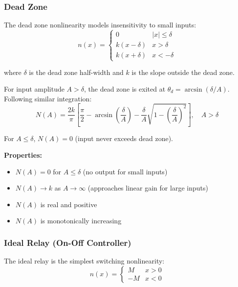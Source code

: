 \subsubsection{Dead Zone}

The dead zone nonlinearity models insensitivity to small inputs:
\begin{equation}
n(x) = \begin{cases}
0 & |x| \leq \delta \\
k(x - \delta) & x > \delta \\
k(x + \delta) & x < -\delta
\end{cases}
\label{eq:deadzone_def}
\end{equation}

where $\delta$ is the dead zone half-width and $k$ is the slope outside the dead zone.

For input amplitude $A > \delta$, the dead zone is exited at $\theta_d = \arcsin(\delta/A)$. Following similar integration:
\begin{equation}
\boxed{N(A) = \frac{2k}{\pi}\left[\frac{\pi}{2} - \arcsin\left(\frac{\delta}{A}\right) - \frac{\delta}{A}\sqrt{1 - \left(\frac{\delta}{A}\right)^2}\right], \quad A > \delta}
\label{eq:df_deadzone}
\end{equation}

For $A \leq \delta$, $N(A) = 0$ (input never exceeds dead zone).

\textbf{Properties:}
\begin{itemize}
    \item $N(A) = 0$ for $A \leq \delta$ (no output for small inputs)
    \item $N(A) \to k$ as $A \to \infty$ (approaches linear gain for large inputs)
    \item $N(A)$ is real and positive
    \item $N(A)$ is monotonically increasing
\end{itemize}

\subsubsection{Ideal Relay (On-Off Controller)}

The ideal relay is the simplest switching nonlinearity:
\begin{equation}
n(x) = \begin{cases}
M & x > 0 \\
-M & x < 0
\end{cases}
\label{eq:relay_def}
\end{equation}

